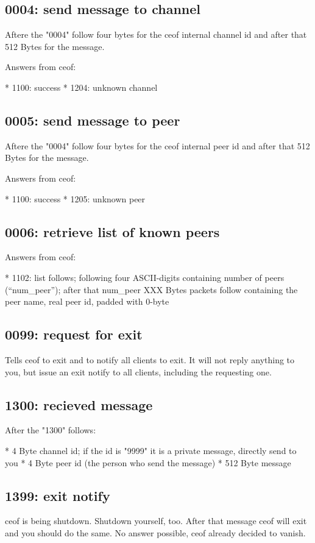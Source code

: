 \documentclass[12pt,a4paper]{article}
\begin{document}
\subsection{0004: send message to channel}

Aftere the "0004" follow four bytes for the ceof internal channel id and after that 512 Bytes for the message.

Answers from ceof:

    * 1100: success
    * 1204: unknown channel


\subsection{0005: send message to peer}

Aftere the "0004" follow four bytes for the ceof internal peer id and after that 512 Bytes for the message.

Answers from ceof:

    * 1100: success
    * 1205: unknown peer


\subsection{0006: retrieve list of known peers}

Answers from ceof:

    * 1102: list follows; following four ASCII-digits containing number
 of peers ("`num\_peer"'); after that  num\_peer  XXX Bytes packets follow containing the peer name, real peer id, padded with 0-byte

\subsection{0099: request for exit}

Tells ceof to exit and to notify all clients to exit. It will not reply anything to you, but issue an exit notify to all clients, including the requesting one.


\subsection{1300: recieved message}

After the "1300" follows:

    * 4 Byte channel id; if the id is "9999" it is a private message, directly send to you
    * 4 Byte peer id (the person who send the message)
    * 512 Byte message


\subsection{1399: exit notify}

ceof is being shutdown. Shutdown yourself, too. After that message ceof will exit and you should do the same. No answer possible, ceof already decided to vanish.
\end{document}
